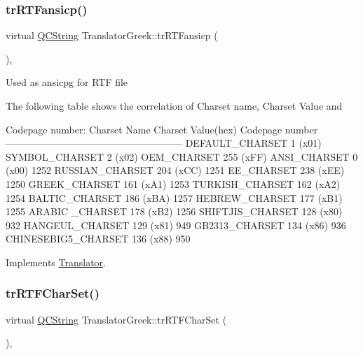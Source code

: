 \subsubsection{\texorpdfstring{trRTFansicp()}{trRTFansicp()}}
{\footnotesize\ttfamily virtual \mbox{\hyperlink{class_q_c_string}{Q\+C\+String}} Translator\+Greek\+::tr\+R\+T\+Fansicp (\begin{DoxyParamCaption}{ }\end{DoxyParamCaption})\hspace{0.3cm}{\ttfamily [inline]}, {\ttfamily [virtual]}}

Used as ansicpg for R\+TF file

The following table shows the correlation of Charset name, Charset Value and 
\begin{DoxyPre}
Codepage number:
Charset Name       Charset Value(hex)  Codepage number
------------------------------------------------------
DEFAULT\_CHARSET           1 (x01)
SYMBOL\_CHARSET            2 (x02)
OEM\_CHARSET             255 (xFF)
ANSI\_CHARSET              0 (x00)            1252
RUSSIAN\_CHARSET         204 (xCC)            1251
EE\_CHARSET              238 (xEE)            1250
GREEK\_CHARSET           161 (xA1)            1253
TURKISH\_CHARSET         162 (xA2)            1254
BALTIC\_CHARSET          186 (xBA)            1257
HEBREW\_CHARSET          177 (xB1)            1255
ARABIC \_CHARSET         178 (xB2)            1256
SHIFTJIS\_CHARSET        128 (x80)             932
HANGEUL\_CHARSET         129 (x81)             949
GB2313\_CHARSET          134 (x86)             936
CHINESEBIG5\_CHARSET     136 (x88)             950
\end{DoxyPre}
 

Implements \mbox{\hyperlink{class_translator_a9953a4c0e6a4fc7d017abcd5c2939e0f}{Translator}}.

\mbox{\label{class_translator_greek_a34c20fb3ca506b053c375cd1a0a1feaa}} 
\subsubsection{\texorpdfstring{trRTFCharSet()}{trRTFCharSet()}}
{\footnotesize\ttfamily virtual \mbox{\hyperlink{class_q_c_string}{Q\+C\+String}} Translator\+Greek\+::tr\+R\+T\+F\+Char\+Set (\begin{DoxyParamCaption}{ }\end{DoxyParamCaption})\hspace{0.3cm}{\ttfamily [inline]}, {\ttfamily [virtual]}}


